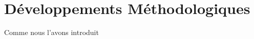



\chapter{Développements Méthodologiques}




\label{app:methodology} %






Comme nous l'avons introduit 


\bigskip


